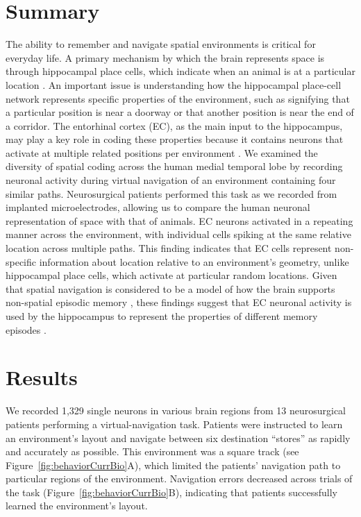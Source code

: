  

  
  
\section{Summary}

The ability to remember and navigate spatial environments is critical for everyday life. A primary mechanism by which the brain represents space is through hippocampal place cells, which indicate when an animal is at a particular location \citep{OKeeDost71}. An important issue is understanding how the hippocampal place-cell network represents specific properties of the environment, such as signifying that a particular position is near a doorway or that another position is near the end of a corridor. The entorhinal cortex (EC), as the main input to the hippocampus, may play a key role in coding these properties because it contains neurons that activate at multiple related positions per environment \cite{FranEtal00,HaftEtal05,DerdEtal09,SolsEtal08,BjerEtal14}.  We examined the diversity of spatial coding across the human medial temporal lobe by recording neuronal activity during virtual navigation of an environment containing four similar paths. Neurosurgical patients performed this task as we recorded from implanted microelectrodes, allowing us to compare the human neuronal representation of space with that of animals. EC neurons activated in a repeating manner across the environment, with individual cells spiking at the same relative location across multiple paths. This finding indicates that EC cells represent non-specific information about location relative to an environment's geometry, unlike hippocampal place cells, which activate at particular random locations. Given that spatial navigation is considered to be a model of how the brain supports non-spatial episodic memory \cite{EichLipt08,BirdBurg08,Hass12,BuzsMose13}, these findings suggest that EC neuronal activity is used by the hippocampus to represent the properties of different memory episodes \cite{FranEtal00,BuckEtal04}.




\section{Results}
We recorded 1,329 single neurons in various brain regions from 13 neurosurgical patients performing a virtual-navigation task.  Patients were instructed to learn an environment's layout and navigate between six destination ``stores''  as rapidly and accurately as possible. This environment was a square track (see Figure~\ref{fig:behaviorCurrBio}A), which limited the patients' navigation path to particular regions of the environment. Navigation errors decreased across trials of the task (Figure~\ref{fig:behaviorCurrBio}B), indicating that patients successfully learned the environment's layout.
  

